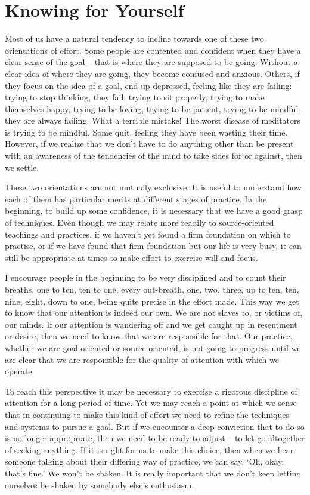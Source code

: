 \section{Knowing for Yourself}

Most of us have a natural tendency to incline towards one of these two
orientations of effort. Some people are contented and confident when
they have a clear sense of the goal -- that is where they are supposed
to be going. Without a clear idea of where they are going, they become
confused and anxious. Others, if they focus on the idea of a goal, end
up depressed, feeling like they are failing: trying to stop thinking,
they fail; trying to sit properly, trying to make themselves happy,
trying to be loving, trying to be patient, trying to be mindful -- they
are always failing. What a terrible mistake! The worst disease of
meditators is trying to be mindful. Some quit, feeling they have been
wasting their time. However, if we realize that we don't have to do
anything other than be present with an awareness of the tendencies of
the mind to take sides for or against, then we settle.

These two orientations are not mutually exclusive. It is useful to
understand how each of them has particular merits at different stages of
practice. In the beginning, to build up some confidence, it is necessary
that we have a good grasp of techniques. Even though we may relate more
readily to source-oriented teachings and practices, if we haven't yet
found a firm foundation on which to practise, or if we have found that
firm foundation but our life is very busy, it can still be appropriate
at times to make effort to exercise will and focus.

I encourage people in the beginning to be very disciplined and to count
their breaths, one to ten, ten to one, every out-breath, one, two,
three, up to ten, ten, nine, eight, down to one, being quite precise in
the effort made. This way we get to know that our attention is indeed
our own. We are not slaves to, or victims of, our minds. If our
attention is wandering off and we get caught up in resentment or desire,
then we need to know that we are responsible for that. Our practice,
whether we are goal-oriented or source-oriented, is not going to
progress until we are clear that we are responsible for the quality of
attention with which we operate.

To reach this perspective it may be necessary to exercise a rigorous
discipline of attention for a long period of time. Yet we may reach a
point at which we sense that in continuing to make this kind of effort
we need to refine the techniques and systems to pursue a goal. But if we
encounter a deep conviction that to do so is no longer appropriate, then
we need to be ready to adjust -- to let go altogether of seeking
anything. If it is right for us to make this choice, then when we hear
someone talking about their differing way of practice, we can say, `Oh,
okay, that's fine.' We won't be shaken. It is really important that we
don't keep letting ourselves be shaken by somebody else's enthusiasm.

